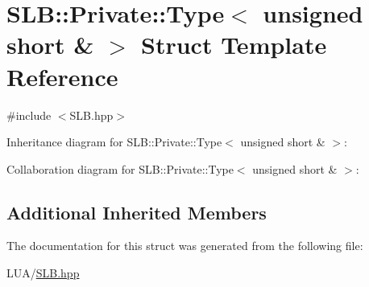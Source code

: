\hypertarget{structSLB_1_1Private_1_1Type_3_01unsigned_01short_01_6_01_4}{}\section{S\+LB\+:\+:Private\+:\+:Type$<$ unsigned short \& $>$ Struct Template Reference}
\label{structSLB_1_1Private_1_1Type_3_01unsigned_01short_01_6_01_4}


{\ttfamily \#include $<$S\+L\+B.\+hpp$>$}



Inheritance diagram for S\+LB\+:\+:Private\+:\+:Type$<$ unsigned short \& $>$\+:


Collaboration diagram for S\+LB\+:\+:Private\+:\+:Type$<$ unsigned short \& $>$\+:
\subsection*{Additional Inherited Members}


The documentation for this struct was generated from the following file\+:\begin{DoxyCompactItemize}
\item 
L\+U\+A/\hyperlink{SLB_8hpp}{S\+L\+B.\+hpp}\end{DoxyCompactItemize}
